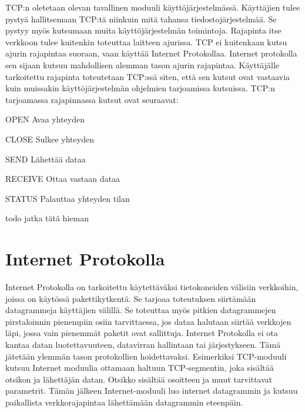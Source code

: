 \documentclass[utf8]{gradu3}
\begin{document}
TCP:n oletetaan olevan tavallinen moduuli käyttöjärjestelmässä. Käyttäjien tulee pystyä hallitsemaan TCP:tä niinkuin mitä tahansa tiedostojärjestelmää. Se pystyy myös kutsumaan muita käyttöjärjestelmän toimintoja. Rajapinta itse verkkoon tulee kuitenkin toteuttaa laitteen ajurissa. TCP ei kuitenkaan kutsu ajurin rajapintaa suoraan, vaan käyttää Internet Protokollaa. Internet protokolla sen sijaan kutsuu mahdollisen alemman tason ajurin rajapintaa. Käyttäjälle tarkoitettu rajapinta toteutetaan TCP:ssä siten, että sen kutsut ovat vastaavia kuin muissakin käyttöjärjestelmän ohjelmien tarjoamissa kutsuissa.  TCP:n tarjoamassa rajapinnassa kutsut ovat seuraavat:

\begin{desclist}
\item[OPEN] Avaa yhteyden
\item[CLOSE] Sulkee yhteyden
\item[SEND] Lähettää dataa
\item[RECEIVE] Ottaa vastaan dataa
\item[STATUS] Palauttaa yhteyden tilan
\end{desclist}

todo jatka tätä hieman

\cite{tcp2_3}

\section{Internet Protokolla}

Internet Protokolla on tarkoitettu käytettäväksi tietokoneiden välisiin verkkoihin, joissa on käytössä pakettikytkentä. Se tarjoaa toteutuksen siirtämään datagrammeja käyttäjien välillä. Se toteuttaa myös pitkien datagrammejen pirstaloinnin pienempiin osiin tarvittaessa, jos dataa halutaan siirtää verkkojen läpi, jossa vain pienemmät paketit ovat sallittuja. Internet Protokolla ei ota kantaa datan luotettavuuteen, datavirran hallintaan tai järjestykseen. Tämä jätetään ylemmän tason protokollien hoidettavaksi. Esimerkiksi TCP-moduuli kutsuu Internet moduulia ottamaan haltuun TCP-segmentin, joka sisältää otsikon ja lähettäjän datan. Otsikko sisältää osoitteen ja muut tarvittavat parametrit. Tämän jälkeen Internet-moduuli luo internet datagrammin ja kutsuu paikallista verkkorajapintaa lähettämään datagrammin eteenpäin. \cite{internet_protocol}
\end{document}
